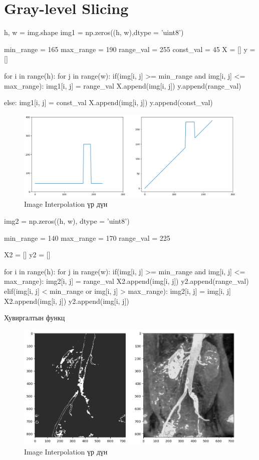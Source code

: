 \documentclass[a4paper]{article}
\begin{document}
\section{Gray-level Slicing}
\begin{python}
h, w = img.shape
img1 = np.zeros((h, w),dtype = 'uint8')

min_range = 165
max_range = 190
range_val = 255
const_val = 45
X = []
y = []

for i in range(h):
    for j in range(w):
        if(img[i, j] >= min_range and img[i, j] <= max_range):
            img1[i, j] = range_val
            X.append(img[i, j])
            y.append(range_val)
            
        else:
            img1[i, j] = const_val
            X.append(img[i, j])
            y.append(const_val)
\end{python}
\begin{figure}[H]
  \centering
  \includegraphics[scale = 0.35]{gray_level_slicing.png}
  \caption[Wider Face]{Image Interpolation үр дүн}
\end{figure}
\begin{python}
img2 = np.zeros((h, w), dtype = 'uint8')

min_range = 140
max_range = 170
range_val = 225

X2 = []
y2 = []

for i in range(h):
    for j in range(w):
        if(img[i, j] >= min_range and img[i, j] <= max_range):
            img2[i, j] = range_val
            X2.append(img[i, j])
            y2.append(range_val)
        elif(img[i, j] < min_range or img[i, j] > max_range):
            img2[i, j] = img[i, j]
            X2.append(img[i, j])
            y2.append(img[i, j])
\end{python}
Хувиргалтын функц
\begin{figure}[H]
  \centering
  \includegraphics[scale = 0.35]{gray_level_slicing_output.png}
  \caption[Wider Face]{Image Interpolation үр дүн}
\end{figure}
\end{document}
